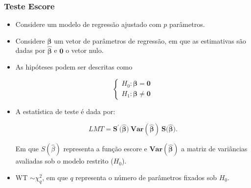 \documentclass[10pt,
  aspectratio=169,
  serif,
  mathserif,
  professionalfont,
  compress,
  handout,
  ]{beamer}\usepackage[]{graphicx}\usepackage[]{color}
\begin{document}

\begin{frame}
  \frametitle{Teste Escore}

\begin{itemize}
  \itemsep 2ex

  \item Considere um modelo de regressão ajustado com $p$ parâmetros.
  
  \item Considere $\boldsymbol{\beta}$ um vetor de parâmetros de regressão, em que as estimativas são dadas por $\boldsymbol{\hat\beta}$ e $\boldsymbol{0}$ o vetor nulo.
  
  \item As hipóteses podem ser descritas como

$$
\left\{\begin{matrix}
H_0: \boldsymbol{\beta} = \boldsymbol{0} \\ 
H_1: \boldsymbol{\beta} \neq \boldsymbol{0}
\end{matrix}\right.
$$

  \item A estatística de teste é dada por:

$$ LMT = \boldsymbol{S^{'}(\hat\beta}) \ \boldsymbol{Var(\hat\beta)} \ \boldsymbol{S(\hat\beta}).$$

Em que $S(\hat\beta)$ representa a função escore e $\boldsymbol{Var(\hat\beta)}$ a matriz de variâncias avaliadas sob o modelo restrito ($H_0$).

 \item  WT $\sim \chi^2_q$, em que $q$ representa o número de parâmetros fixados sob $H_0$.

\end{itemize}

\end{frame}

\end{document}
